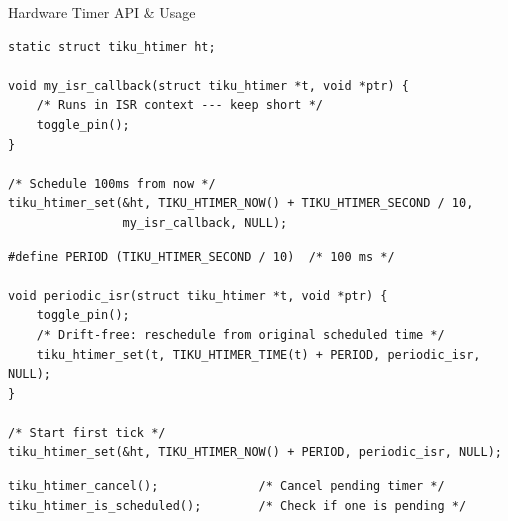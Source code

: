 \documentclass[aspectratio=169, 10pt]{beamer}
\begin{document}
\begin{frame}[fragile]{Hardware Timer API \& Usage}
\begin{lstlisting}[style=cstyle, title={One-shot hardware timer}]
static struct tiku_htimer ht;

void my_isr_callback(struct tiku_htimer *t, void *ptr) {
    /* Runs in ISR context --- keep short */
    toggle_pin();
}

/* Schedule 100ms from now */
tiku_htimer_set(&ht, TIKU_HTIMER_NOW() + TIKU_HTIMER_SECOND / 10,
                my_isr_callback, NULL);
\end{lstlisting}

\begin{lstlisting}[style=cstyle, title={Periodic hardware timer (self-rescheduling)}]
#define PERIOD (TIKU_HTIMER_SECOND / 10)  /* 100 ms */

void periodic_isr(struct tiku_htimer *t, void *ptr) {
    toggle_pin();
    /* Drift-free: reschedule from original scheduled time */
    tiku_htimer_set(t, TIKU_HTIMER_TIME(t) + PERIOD, periodic_isr, NULL);
}

/* Start first tick */
tiku_htimer_set(&ht, TIKU_HTIMER_NOW() + PERIOD, periodic_isr, NULL);
\end{lstlisting}

\begin{lstlisting}[style=cstyle, title={Cancel and query}]
tiku_htimer_cancel();              /* Cancel pending timer */
tiku_htimer_is_scheduled();        /* Check if one is pending */
\end{lstlisting}
\end{frame}
\end{document}
